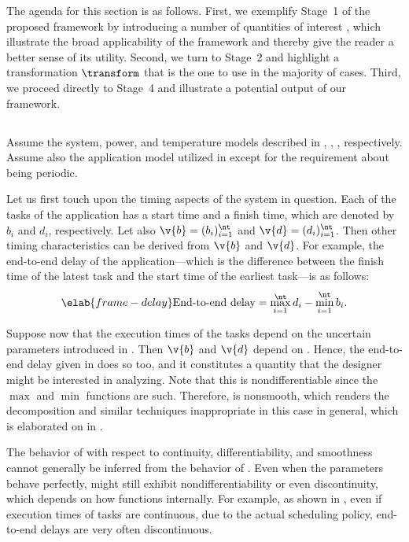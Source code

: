 The agenda for this section is as follows. First, we exemplify Stage~1 of the
proposed framework by introducing a number of quantities of interest \g, which
illustrate the broad applicability of the framework and thereby give the reader
a better sense of its utility. Second, we turn to Stage~2 and highlight a
transformation $\transform$ that is the one to use in the majority of cases.
Third, we proceed directly to Stage~4 and illustrate a potential output of our
framework.

\subsection{\problemtitle}

Assume the system, power, and temperature models described in
, , , respectively.
Assume also the application model utilized in 
except for the requirement about being periodic.

Let us first touch upon the timing aspects of the system in question. Each of
the \nt tasks of the application has a start time and a finish time, which are
denoted by $b_i$ and $d_i$, respectively. Let also $\v{b} = (b_i)_{i = 1}^\nt$
and $\v{d} = (d_i)_{i = 1}^\nt$. Then other timing characteristics can be
derived from $\v{b}$ and $\v{d}$. For example, the end-to-end delay of the
application---which is the difference between the finish time of the latest task
and the start time of the earliest task---is as follows:
\begin{equation} \elab{frame-delay}
  \text{End-to-end delay}
  = \max_{i = 1}^\nt d_i - \min_{i = 1}^\nt b_i.
\end{equation}

Suppose now that the execution times of the tasks depend on the uncertain
parameters \vu introduced in . Then $\v{b}$ and $\v{d}$
depend on \vu. Hence, the end-to-end delay given in  does so
too, and it constitutes a quantity \g that the designer might be interested in
analyzing. Note that this \g is nondifferentiable since the $\max$ and $\min$
functions are such. Therefore, \g is nonsmooth, which renders the 
decomposition and similar techniques inappropriate in this case in general,
which is elaborated on in .

\begin{remark} 
The behavior of \g with respect to continuity, differentiability, and smoothness
cannot generally be inferred from the behavior of \vu. Even when the parameters
behave perfectly, \g might still exhibit nondifferentiability or even
discontinuity, which depends on how \g functions internally. For example, as
shown in \cite{tanasa2015}, even if execution times of tasks are continuous, due
to the actual scheduling policy, end-to-end delays are very often discontinuous.
\end{remark}

